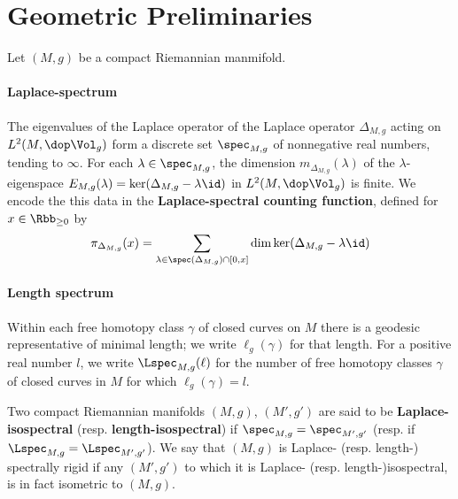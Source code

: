 \section{Geometric Preliminaries}
Let $(M,g)$ be a compact Riemannian manmifold.
\paragraph{Laplace-spectrum}
The eigenvalues of the Laplace operator of the Laplace operator $\Delta_{M,g}$ acting on $L^2(M,\dop \Vol_g)$ form a discrete set $\spec_{M,g}$ of nonnegative real numbers, tending to $\infty$. For each $\lambda \in \spec_{M,g}$, the dimension $m_{\Delta_{M,g}}(\lambda)$ of the $\lambda$-eigenspace $E_{M,g}(\lambda)=\ker (\Delta_{M,g}- \lambda \id)$ in $L^2(M, \dop \Vol_g)$ is finite. We encode the this data in the \textbf{Laplace-spectral counting function}, defined for $x\in \Rbb_{\geq 0}$ by
\begin{align}
  \pi_{\Delta_{M,g}}(x) = \sum_{\lambda \in \spec(\Delta_{M,g}) \cap [0,x]} \dim \ker (\Delta_{M,g} - \lambda \id )
\end{align}


\paragraph{Length spectrum}
Within each free homotopy class $\gamma$ of closed curves on $M$ there is a geodesic representative of minimal length; we write $\ell_g(\gamma)$ for that length. For a positive real number $l$, we write $\Lspec_{M,g}(\ell)$ for the number of free homotopy classes $\gamma$ of closed curves in $M$ for which $\ell_g(\gamma) = l$.


Two compact Riemannian manifolds $(M,g)$, $(M',g')$  are said to be \textbf{Laplace-isospectral} (resp. \textbf{length-isospectral})  if $\spec_{M,g} = \spec_{M',g'}$ (resp.  if $\Lspec_{M,g}=\Lspec_{M',g'}$). We say that $(M,g)$ is Laplace- (resp. length-) spectrally rigid if any $(M',g')$ to which it is Laplace- (resp. length-)isospectral, is in fact isometric to $(M,g)$.

